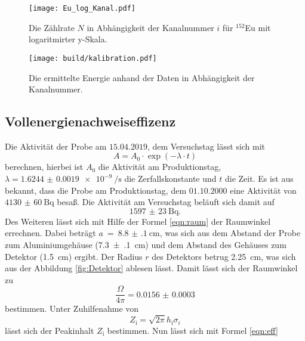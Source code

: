 \begin{figure}[htb]
 \centering
 \texttt{[image: Eu\_log\_Kanal.pdf]}
 \caption{Die Zählrate $N$ in Abhängigkeit der Kanalnummer $i$ für ${}^{152}$Eu mit logaritmirter y-Skala.}
 \label{fig:Eu_log_Kanal}
\end{figure}

\begin{figure}[htb]
 \centering
 \texttt{[image: build/kalibration.pdf]}
 \caption{Die ermittelte Energie anhand der Daten in Abhängigkeit der Kanalnummer.}
 \label{fig:kalibration}
\end{figure}


\FloatBarrier

\subsection{Vollenergienachweiseffizenz}
\label{sec:Vollenergienachweiseffizenz}
Die Aktivität der Probe am $15.04.2019$, dem Versuchstag lässt sich mit
\begin{equation}
  A = A_0 \cdot \exp{\left(-\lambda \cdot t\right)}
\end{equation}
berechnen, hierbei ist $A_0$ die Aktivität am Produktionstag,
$\lambda = \SI[per-mode = reciprocal-positive-first]{1.6244(19)e-9}{\per\second}$ \cite{referenz1} 
die Zerfallskonstante und $t$ die Zeit. Es ist aus \cite{V18} bekannt, dass die Probe am Produktionstag, dem
$01.10.2000$ eine Aktivität von $\SI{4130(60)}{\becquerel}$ besaß.
Die Aktivität am Versuchstag beläuft sich damit auf
\begin{equation*}
  \SI{1597(23)}{\becquerel}.
\end{equation*}
Des Weiteren lässt sich mit Hilfe der Formel \ref{eqn:raum} der Raumwinkel errechnen.
Dabei beträgt $a~=~\SI{8.8(1)}{\centi\meter}$, was sich aus dem Abstand der Probe zum
Aluminiumgehäuse (\SI{7.3(1)}{\centi\meter}) und dem Abstand des Gehäuses zum Detektor 
(\SI{1.5}{\centi\meter}) ergibt. Der Radius $r$ des Detektors betrug \SI{2.25}{\centi\meter}, was sich
aus der Abbildung \ref{fig:Detektor} ablesen lässt. Damit lässt sich der Raumwinkel zu
\begin{equation*}
  \frac{\Omega}{4\pi} = \num{0.0156(3)}
\end{equation*}
bestimmen.
Unter Zuhilfenahme von
\begin{equation}
  Z_\text{i} = \sqrt{2\pi} h_\text{i} \sigma_{i}
\end{equation}
lässt sich der Peakinhalt $Z_\text{i}$ bestimmen. Nun lässt sich mit Formel \ref{eqn:eff}
